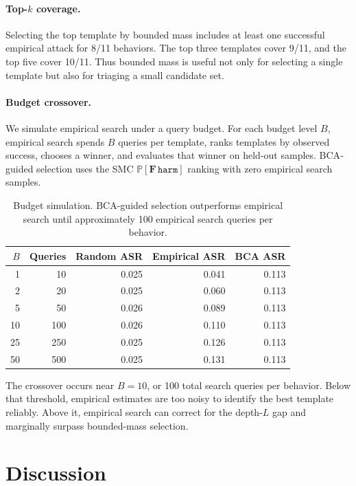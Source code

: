 \documentclass[11pt]{article}
\newcommand{\Prob}{\mathbb{P}}
\newcommand{\harm}{\texttt{harm}}
\newcommand{\BCA}{\textsc{BCA}}
\begin{document}
\paragraph{Top-$k$ coverage.}
Selecting the top template by bounded mass includes at least one successful empirical attack for 8/11 behaviors.  The top three templates cover 9/11, and the top five cover 10/11.  Thus bounded mass is useful not only for selecting a single template but also for triaging a small candidate set.

\paragraph{Budget crossover.}
We simulate empirical search under a query budget.  For each budget level $B$, empirical search spends $B$ queries per template, ranks templates by observed success, chooses a winner, and evaluates that winner on held-out samples.  \BCA-guided selection uses the SMC $\Prob[\mathbf{F}\,\harm]$ ranking with zero empirical search samples.

\begin{table}[t]
\centering
\small
\begin{tabular}{rrrrr}
\toprule
$B$ & \textbf{Queries} & \textbf{Random ASR} & \textbf{Empirical ASR} & \textbf{BCA ASR}\\
\midrule
1 & 10 & 0.025 & 0.041 & 0.113\\
2 & 20 & 0.025 & 0.060 & 0.113\\
5 & 50 & 0.026 & 0.089 & 0.113\\
10 & 100 & 0.026 & 0.110 & 0.113\\
25 & 250 & 0.025 & 0.126 & 0.113\\
50 & 500 & 0.025 & 0.131 & 0.113\\
\bottomrule
\end{tabular}
\caption{Budget simulation.  \BCA-guided selection outperforms empirical search until approximately 100 empirical search queries per behavior.}
\label{tab:budget}
\end{table}

The crossover occurs near $B=10$, or 100 total search queries per behavior.  Below that threshold, empirical estimates are too noisy to identify the best template reliably.  Above it, empirical search can correct for the depth-$L$ gap and marginally surpass bounded-mass selection.

\section{Discussion}
\label{sec:discussion}
\end{document}
